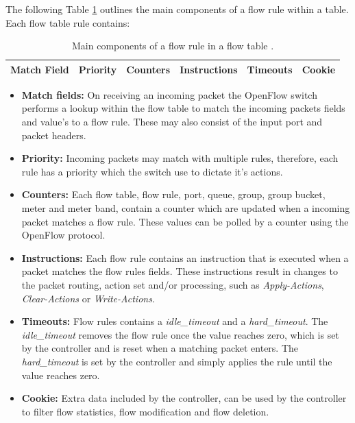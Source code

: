 \documentclass[12pt, oneside]{book}
\begin{document}
The following Table \ref{fig:openflowTable} outlines the main components of a
flow rule within a table. Each flow table rule contains:

\begin{table}[H]
	\centering
	\begin{tabular}{|c|c|c|c|c|c|}
	\hline
	\textbf{Match Field} & \textbf{Priority} & \textbf{Counters} & \textbf{Instructions} & \textbf{Timeouts} & \textbf{Cookie} \\ \hline
	\end{tabular}
	\caption{Main components of a flow rule in a flow table \cite{openflow}.}
	\label{fig:openflowTable}
\end{table}

\begin{itemize}
	\item \textbf{Match fields:} On receiving an incoming packet the OpenFlow switch performs a lookup within the flow table to
				match the incoming packets fields and value's to a flow rule.
				These may also consist of the input port and packet headers.
	\item \textbf{Priority:} Incoming packets may match with multiple rules, therefore,
				each rule has a priority which the switch use to dictate it's actions.
	\item \textbf{Counters:} Each flow table, flow rule, port, queue, group, group bucket,
				meter and meter band, contain a counter which are updated when a incoming packet matches a flow rule.
				These values can be polled by a counter using the OpenFlow protocol.
	\item \textbf{Instructions:} Each flow rule contains an instruction that is executed when a packet matches the flow rules fields.
				These instructions result in changes to the packet routing, action set and/or processing, such as \emph{Apply-Actions}, \emph{Clear-Actions}
				or \emph{Write-Actions}.
	\item \textbf{Timeouts:} Flow rules contains a \emph{idle\_timeout} and a \emph{hard\_timeout}.
				The \emph{idle\_timeout} removes the flow rule once the 
				value reaches zero, which is set by the controller and is reset when a matching packet enters. The \emph{hard\_timeout}
				is set by the controller and simply applies the rule until the value reaches zero.
	\item	\textbf{Cookie:} Extra data included by the controller, can be used by the controller to
				filter flow statistics, flow modification and flow deletion.
\end{itemize}
\end{document}
